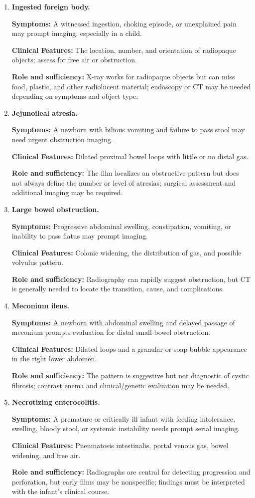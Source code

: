 \begin{enumerate}[leftmargin=*,itemsep=0.45em,topsep=0.4em]
\item \textbf{Ingested foreign body.}\par\noindent\textbf{Symptoms:} A witnessed ingestion, choking episode, or unexplained pain may prompt imaging, especially in a child.\par\noindent\textbf{Clinical Features:} The location, number, and orientation of radiopaque objects; assess for free air or obstruction.\par\noindent\textbf{Role and sufficiency:} X-ray works for radiopaque objects but can miss food, plastic, and other radiolucent material; endoscopy or CT may be needed depending on symptoms and object type.
\item \textbf{Jejunoileal atresia.}\par\noindent\textbf{Symptoms:} A newborn with bilious vomiting and failure to pass stool may need urgent obstruction imaging.\par\noindent\textbf{Clinical Features:} Dilated proximal bowel loops with little or no distal gas.\par\noindent\textbf{Role and sufficiency:} The film localizes an obstructive pattern but does not always define the number or level of atresias; surgical assessment and additional imaging may be required.
\item \textbf{Large bowel obstruction.}\par\noindent\textbf{Symptoms:} Progressive abdominal swelling, constipation, vomiting, or inability to pass flatus may prompt imaging.\par\noindent\textbf{Clinical Features:} Colonic widening, the distribution of gas, and possible volvulus pattern.\par\noindent\textbf{Role and sufficiency:} Radiography can rapidly suggest obstruction, but CT is generally needed to locate the transition, cause, and complications.
\item \textbf{Meconium ileus.}\par\noindent\textbf{Symptoms:} A newborn with abdominal swelling and delayed passage of meconium prompts evaluation for distal small-bowel obstruction.\par\noindent\textbf{Clinical Features:} Dilated loops and a granular or soap-bubble appearance in the right lower abdomen.\par\noindent\textbf{Role and sufficiency:} The pattern is suggestive but not diagnostic of cystic fibrosis; contrast enema and clinical/genetic evaluation may be needed.
\item \textbf{Necrotizing enterocolitis.}\par\noindent\textbf{Symptoms:} A premature or critically ill infant with feeding intolerance, swelling, bloody stool, or systemic instability needs prompt serial imaging.\par\noindent\textbf{Clinical Features:} Pneumatosis intestinalis, portal venous gas, bowel widening, and free air.\par\noindent\textbf{Role and sufficiency:} Radiographs are central for detecting progression and perforation, but early films may be nonspecific; findings must be interpreted with the infant's clinical course.

\end{enumerate}
